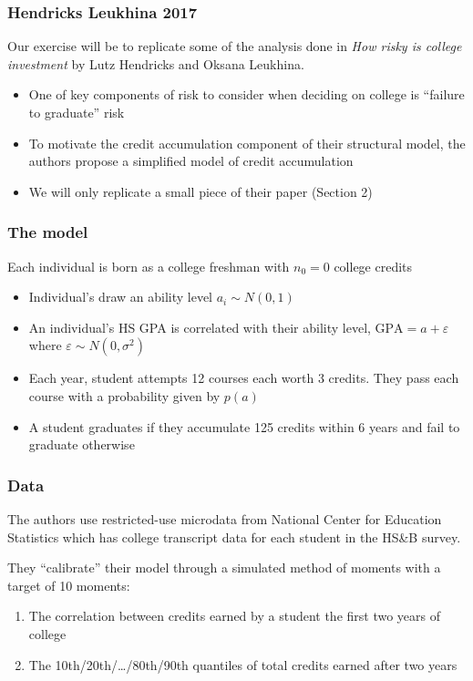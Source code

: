 \documentclass[10pt]{beamer}
\begin{document}
  \begin{frame} \frametitle{Hendricks Leukhina 2017}

    Our exercise will be to replicate some of the analysis done in \textit{How risky is
    college investment} by Lutz Hendricks and Oksana Leukhina.

    \begin{itemize}
      \item One of key components of risk to consider when deciding on college is ``failure to
            graduate'' risk
      \item To motivate the credit accumulation component of their structural model, the authors
            propose a simplified model of credit accumulation
      \item We will only replicate a small piece of their paper (Section 2)
    \end{itemize}

  \end{frame}

  \begin{frame} \frametitle{The model}

    Each individual is born as a college freshman with $n_0 = 0$ college credits

    \begin{itemize}
      \item Individual's draw an ability level $a_i \sim N(0, 1)$
      \item An individual's HS GPA is correlated with their ability level,
        $\text{GPA} = a + \varepsilon$ where $\varepsilon \sim N(0, \sigma^2)$
      \item Each year, student attempts 12 courses each worth 3 credits. They pass each
        course with a probability given by $p(a)$
      \item A student graduates if they accumulate 125 credits within 6 years and fail
        to graduate otherwise
    \end{itemize}

  \end{frame}

  \begin{frame} \frametitle{Data}

    The authors use restricted-use microdata from National Center for Education
    Statistics which has college transcript data for each student in the HS\&B survey.

    They ``calibrate'' their model through a simulated method of moments with a target
    of 10 moments:

    \begin{enumerate}
      \item The correlation between credits earned by a student the first two years of
        college
      \item The 10th/20th/\dots/80th/90th quantiles of total credits earned after two
        years
    \end{enumerate}

  \end{frame}
\end{document}
